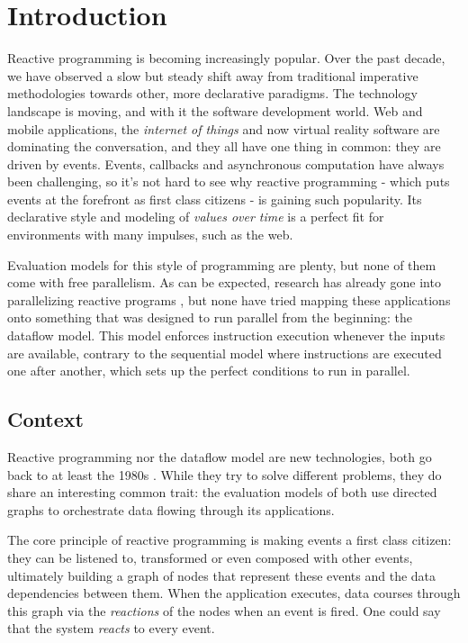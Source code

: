 \chapter{Introduction}

Reactive programming is becoming increasingly popular. Over the past decade, we have observed a slow but steady shift away from traditional imperative methodologies towards other, more declarative paradigms.
The technology landscape is moving, and with it the software development world. Web and mobile applications, the \textit{internet of things} and now virtual reality software are dominating the conversation, and they all have one thing in common: they are driven by events. Events, callbacks and asynchronous computation have always been challenging, so it's not hard to see why reactive programming - which puts events at the forefront as first class citizens - is gaining such popularity. Its declarative style and modeling of \textit{values over time} is a perfect fit for environments with many impulses, such as the web.

Evaluation models for this style of programming are plenty, but none of them come with free parallelism. As can be expected, research has already gone into parallelizing reactive programs \citep{peterson_parallel_2000}, but none have tried mapping these applications onto something that was designed to run parallel from the beginning: the dataflow model. 
This model enforces instruction execution whenever the inputs are available, contrary to the sequential model where instructions are executed one after another, which sets up the perfect conditions to run in parallel.

\section{Context}

Reactive programming nor the dataflow model are new technologies, both go back to at least the 1980s \citep{harel_development_1985, veen_dataflow_1986}. While they try to solve different problems, they do share an interesting common trait: the evaluation models of both use directed graphs to orchestrate data flowing through its applications. 

The core principle of reactive programming is making events a first class citizen: they can be listened to, transformed or even composed with other events, ultimately building a graph of nodes that represent these events and the data dependencies between them. When the application executes, data courses through this graph via the \textit{reactions} of the nodes when an event is fired. One could say that the system \textit{reacts} to every event.

